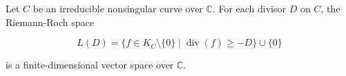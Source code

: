 Let $C$ be an irreducible nonsingular curve over $\mathbb{C}$. For each divisor $D$ on $C$, the Riemann-Roch space

$$L(D) = \{ f \in K_C \setminus \{0\} \mid \operatorname{div}(f) \geqslant -D \} \cup \{0\}$$

is a finite-dimensional vector space over $\mathbb{C}$.
